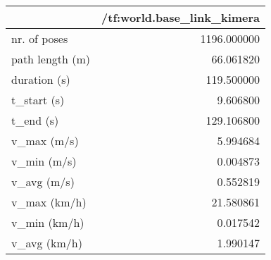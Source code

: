 \begin{tabular}{lr}
\toprule
{} &  /tf:world.base\_link\_kimera \\
\midrule
nr. of poses    &                 1196.000000 \\
path length (m) &                   66.061820 \\
duration (s)    &                  119.500000 \\
t\_start (s)     &                    9.606800 \\
t\_end (s)       &                  129.106800 \\
v\_max (m/s)     &                    5.994684 \\
v\_min (m/s)     &                    0.004873 \\
v\_avg (m/s)     &                    0.552819 \\
v\_max (km/h)    &                   21.580861 \\
v\_min (km/h)    &                    0.017542 \\
v\_avg (km/h)    &                    1.990147 \\
\bottomrule
\end{tabular}
